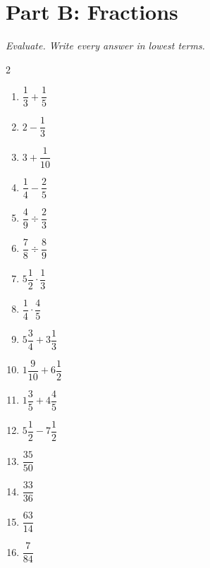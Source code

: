 \documentclass[11pt]{article}
\begin{document}
\section*{Part B: Fractions}
\noindent\textit{Evaluate. Write every answer in lowest terms.}
\begin{multicols}{2}
\begin{enumerate}
  \item $\dfrac{1}{3} + \dfrac{1}{5}$
  \vspace{1.4cm}
  \item $2 - \dfrac{1}{3}$
  \vspace{1.4cm}
  \item $3 + \dfrac{1}{10}$
  \vspace{1.4cm}
  \item $\dfrac{1}{4} - \dfrac{2}{5}$
  \vspace{1.4cm}
  \item $\dfrac{4}{9} \div \dfrac{2}{3}$
  \vspace{1.4cm}
  \item $\dfrac{7}{8} \div \dfrac{8}{9}$
  \vspace{1.4cm}
  \item $5\dfrac{1}{2} \cdot \dfrac{1}{3}$
  \vspace{1.4cm}
  \item $\dfrac{1}{4} \cdot \dfrac{4}{5}$
  \vspace{1.4cm}
  \item $5\dfrac{3}{4} + 3\dfrac{1}{3}$
  \vspace{1.4cm}
  \item $1\dfrac{9}{10} + 6\dfrac{1}{2}$
  \vspace{1.4cm}
  \item $1\dfrac{3}{5} + 4\dfrac{4}{5}$
  \vspace{1.4cm}
  \item $5\dfrac{1}{2} - 7\dfrac{1}{2}$
  \vspace{1.4cm}
  \item $\dfrac{35}{50}$
  \vspace{1.4cm}
  \item $\dfrac{33}{36}$
  \vspace{1.4cm}
  \item $\dfrac{63}{14}$
  \vspace{1.4cm}
  \item $\dfrac{7}{84}$
  \vspace{1.4cm}
\end{enumerate}
\end{multicols}
\end{document}
